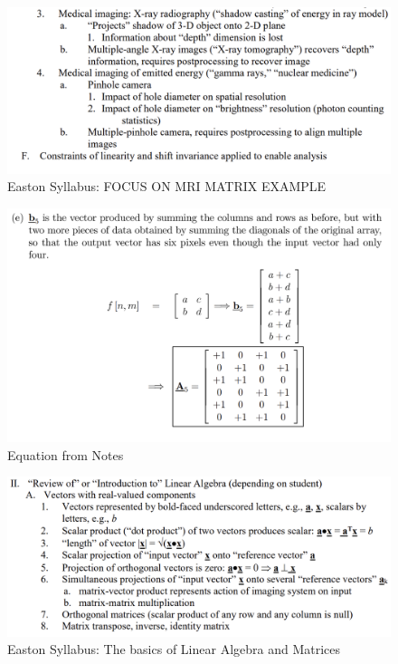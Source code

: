 \documentclass{article}
\begin{document}
\begin{figure}[h!]
\centering
\includegraphics[scale=.65]{Fourier/Week 1/Week1.3.png}
\caption{Easton Syllabus: FOCUS ON MRI MATRIX EXAMPLE}
\label{fig:Snowman}
\end{figure}


\begin{figure}[h!]
\centering
\includegraphics[scale=.65]{Fourier/Week 1/HW/MRI.png}
\caption{Equation from Notes}
\label{fig:Snowman}
\end{figure}



\begin{figure}[h!]
\centering
\includegraphics[scale=.65]{Fourier/Week 1/Week1.4.png}
\caption{Easton Syllabus: The basics of Linear Algebra and Matrices}
\label{fig:Snowman}
\end{figure}
\end{document}
